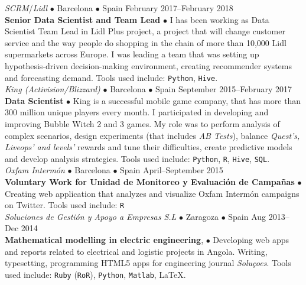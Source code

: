 \documentclass[a4paper, oneside]{scrreprt}
\begin{document}
\vspace{-0.3cm}
\noindent{}\textit{SCRM}/\textit{Lidl} $\bullet$ 
Barcelona $\bullet$ Spain \hfill February 2017--February 2018\\
\noindent\textbf{\small Senior Data Scientist and Team Lead} $\bullet$ 
{\small  I has been working as Data Scientist Team Lead in Lidl Plus project, a project that will
  change customer service and the way people do shopping in the chain of more
  than 10,000 Lidl supermarkets across Europe. I was leading a team that was
  setting up hypothesis-driven decision-making environment, creating recommender
  systems and forecasting demand. Tools used include: \texttt{Python}, \texttt{Hive}.
}\\

\vspace{-0.3cm}
\noindent{}
\hspace{-0.15cm}\textit{King (Activision/Blizzard)} $\bullet$ 
Barcelona $\bullet$ Spain \hfill September 2015--February 2017\\
\noindent\textbf{\small Data Scientist } $\bullet$ 
{\small King is a successful mobile game company, that has more
  than 300 million unique players every month. I participated in developing and
  improving Bubble Witch 2 and 3 games. My
  role was to perform analysis of complex scenarios,
  design experiments (that includes \textit{AB Tests}),
  balance \textit{Quest's, Liveops' and levels'}
  rewards and tune their difficulties,
  create predictive models and develop analysis strategies.
  Tools used include: \texttt{Python}, \texttt{R}, \texttt{Hive}, \texttt{SQL}. }\\

\vspace{-0.3cm}
\noindent{}\textit{Oxfam Intermón} $\bullet$ 
Barcelona $\bullet$ Spain \hfill April--September 2015\\
\noindent\textbf{\small Voluntary Work for Unidad de Monitoreo y Evaluación de Campañas} $\bullet$ 
{\small Creating web application that analyzes and visualize Oxfam Intermón
  campaigns on Twitter.  Tools used
  include: \texttt{R}}\\

\vspace{-0.3cm}
\noindent{}\textit{Soluciones de Gestión y Apoyo a Empresas S.L} 
$\bullet$ Zaragoza $\bullet$ Spain \hfill Aug 2013--Dec 2014\\
\noindent\textbf{\small Mathematical modelling in electric engineering}, $\bullet$ 
{\small Developing web apps and reports related to electrical and
  logistic projects in Angola.  Writing, typesetting, programming
  HTML5 apps for engineering journal \emph{Soluçoes}.  Tools used
  include:
  \texttt{Ruby} (\texttt{RoR}), \texttt{Python}, \texttt{Matlab}, \LaTeX.}\\
\end{document}
